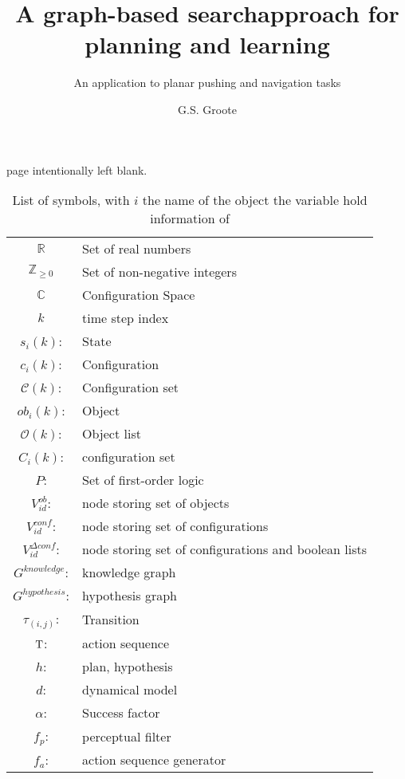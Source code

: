 \documentclass{layout/tudelft-report}
\begin{document}
\frontmatter

\title{A graph-based search\newline approach for planning and learning}

\subtitle{An application to planar pushing and navigation tasks} 

\author{G.S. Groote}
\subject{SC52045: System \& Control Thesis Report}

%
\makecover
page intentionally left blank.
\newpage



\tableofcontents
\listoffigures
\listoftables
\newpage
\begin{table}[H]
    \centering
    \begin{tabular}{c l}
      $\mathbb{R}$ & \textrm{Set of real numbers}\\
      $\mathbb{Z}_{\geq 0}$ & \textrm{Set of non-negative integers}\\
      $\mathbb{C}$ & Configuration Space\\ 
      $k$ & \textrm{time step index}\\
      $s_i(k)$: & \textrm{State}\\
      $c_i(k)$: & \textrm{Configuration}\\
      $\mathcal{C}(k)$: & \textrm{Configuration set} \\
      $ob_i(k)$: & \textrm{Object}\\
      $\mathcal{O}(k)$: & \textrm{Object list}\\
      $C_i(k)$: & \textrm{configuration set}\\
      $P$: & \textrm{Set of first-order logic}\\
      $V^{ob}_{id}$: & \textrm{node storing set of objects}\\
      $V^{conf}_{id}$: & \textrm{node storing set of configurations}\\
      $V^{\Delta conf}_{id}$: & \textrm{node storing set of configurations and boolean lists}\\
      $G^{knowledge}$: & \textrm{knowledge graph}\\
      $G^{hypothesis}$: & \textrm{hypothesis graph}\\
      $\tau_{(i,j)}$: & \textrm{Transition}\\
      $\mathrm{T}$: & \textrm{action sequence}\\
      $h$: & \textrm{plan, hypothesis}\\
      $d$: & \textrm{dynamical model}\\
      $\alpha$: & Success factor\\
      $f_p$: & \textrm{perceptual filter}\\
      $f_a$: & \textrm{action sequence generator}\\
    \end{tabular}
    \caption{List of symbols, with $i$ the name of the object the variable hold information of}
    \label{tab: symbol list}
\end{table}
\end{document}
